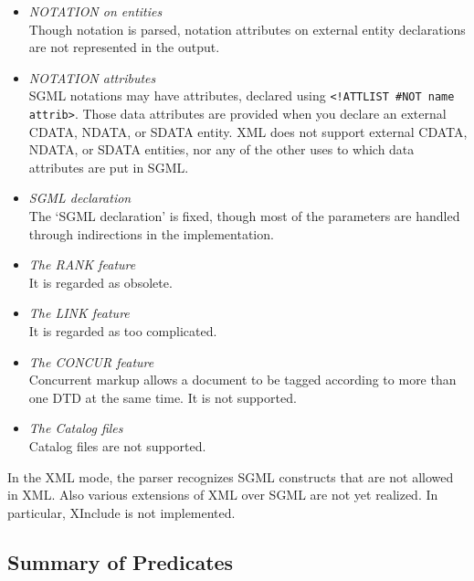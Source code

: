 \begin{itemize}
\item \emph{NOTATION on entities}\mbox{}\\
  Though notation is parsed, notation attributes on external entity 
  declarations are not represented in the output.
\item \emph{NOTATION attributes}\mbox{}\\
  SGML notations may have
  attributes, declared using \verb$<!ATTLIST #NOT name attrib>$. Those data
  attributes are provided when you declare an external CDATA, NDATA, or
  SDATA entity. XML does not support external CDATA, NDATA, or SDATA
  entities, nor any of the other uses to which data attributes are put in
  SGML. 
  

\item \emph{SGML declaration}\mbox{}\\
  The `SGML declaration' is fixed, though most of the parameters are 
  handled through indirections in the implementation. 

\item \emph{The RANK feature}\mbox{}\\
  It is regarded as obsolete.
\item \emph{The LINK feature}\mbox{}\\
  It is regarded as too complicated.
\item \emph{The CONCUR feature}\mbox{}\\
  Concurrent markup allows a document to be tagged according to more than
  one DTD at the same time.  It is not supported.
\item \emph{The Catalog files}\mbox{}\\  Catalog files are not supported.
\end{itemize}



In the XML mode, the parser recognizes SGML constructs that are not allowed 
in XML. Also various extensions of XML over SGML are not yet realized.
In particular, XInclude is not implemented.

\subsection{Summary of Predicates}

